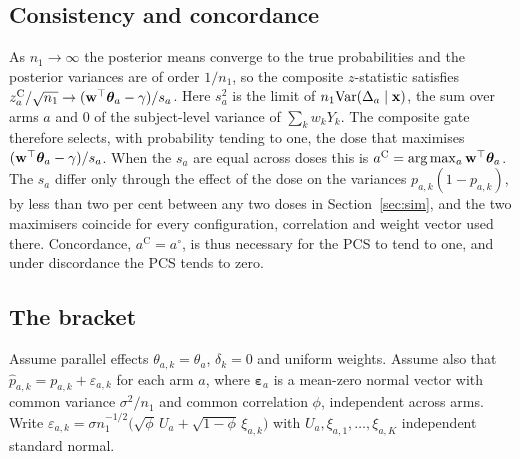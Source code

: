 \begin{appendix}
\subsection{Consistency and concordance}

As $n_1\to\infty$ the posterior means converge to the true probabilities and the posterior variances are of order $1/n_1$, so the composite $z$-statistic satisfies $z^{\mathrm C}_a/\sqrt{n_1}\to(\mathbf{w}^\top\bm\theta_a-\gamma)/s_a$. Here $s_a^2$ is the limit of $n_1\mathrm{Var}(\Delta_a\mid\mathbf{x})$, the sum over arms $a$ and $0$ of the subject-level variance of $\sum_kw_kY_k$. The composite gate therefore selects, with probability tending to one, the dose that maximises $(\mathbf{w}^\top\bm\theta_a-\gamma)/s_a$. When the $s_a$ are equal across doses this is $a^{\mathrm C}=\arg\max_a\mathbf{w}^\top\bm\theta_a$. The $s_a$ differ only through the effect of the dose on the variances $p_{a,k}(1-p_{a,k})$, by less than two per cent between any two doses in Section~\ref{sec:sim}, and the two maximisers coincide for every configuration, correlation and weight vector used there. Concordance, $a^{\mathrm C}=a^\circ$, is thus necessary for the PCS to tend to one, and under discordance the PCS tends to zero.

\subsection{The bracket}

Assume parallel effects $\theta_{a,k}=\theta_a$, $\delta_k=0$ and uniform weights. Assume also that $\hat p_{a,k}=p_{a,k}+\varepsilon_{a,k}$ for each arm $a$, where $\bm\varepsilon_a$ is a mean-zero normal vector with common variance $\sigma^2/n_1$ and common correlation $\phi$, independent across arms. Write $\varepsilon_{a,k}=\sigma n_1^{-1/2}\big(\sqrt\phi\,U_a+\sqrt{1-\phi}\,\xi_{a,k}\big)$ with $U_a,\xi_{a,1},\dots,\xi_{a,K}$ independent standard normal.


\end{appendix}
